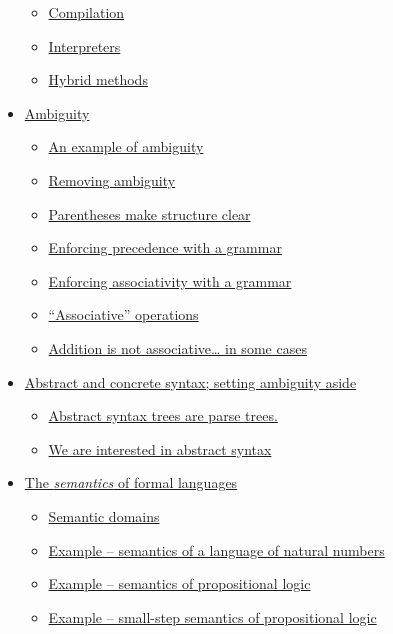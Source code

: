 \documentclass[11pt]{article}
\theoremstyle{definition}
\begin{document}
\begin{scriptsize}
\begin{itemize}
\begin{itemize}
\item \hyperref[sec:org0ca9501]{Compilation}
\item \hyperref[sec:orgaa13a45]{Interpreters}
\item \hyperref[sec:orge6ec617]{Hybrid methods}
\end{itemize}
\item \hyperref[sec:org125ae96]{Ambiguity}
\begin{itemize}
\item \hyperref[sec:org70ba837]{An example of ambiguity}
\item \hyperref[sec:org6e95f3d]{Removing ambiguity}
\item \hyperref[sec:org7e601aa]{Parentheses make structure clear}
\item \hyperref[sec:orgdb936c6]{Enforcing precedence with a grammar}
\item \hyperref[sec:orgb4ee6cb]{Enforcing associativity with a grammar}
\item \hyperref[sec:org33188e1]{“Associative” operations}
\item \hyperref[sec:orgdf4e0d6]{Addition is not associative… in some cases}
\end{itemize}
\item \hyperref[sec:org60da28f]{Abstract and concrete syntax; setting ambiguity aside}
\begin{itemize}
\item \hyperref[sec:orgfb24a65]{Abstract syntax trees are parse trees.}
\item \hyperref[sec:org7dde460]{We are interested in abstract syntax}
\end{itemize}
\item \hyperref[sec:orgbab7968]{The \emph{semantics} of formal languages}
\begin{itemize}
\item \hyperref[sec:orgce55932]{Semantic domains}
\item \hyperref[sec:orge24e1fa]{Example – semantics of a language of natural numbers}
\item \hyperref[sec:org0e35420]{Example – semantics of propositional logic}
\item \hyperref[sec:org17308c4]{Example – small-step semantics of propositional logic}
\end{itemize}
\end{itemize}
\end{scriptsize}
\end{document}
